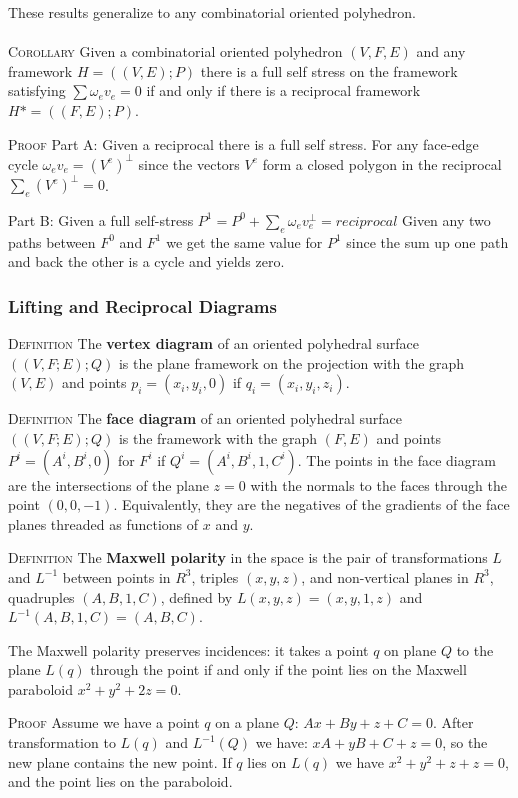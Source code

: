 \documentclass[english]{article}
\begin{document}
These results generalize to any combinatorial oriented polyhedron. \\
\\
\textsc{Corollary} Given a combinatorial oriented polyhedron $(V,F,E)$ and any framework $H = ((V,E);P)$ there is a full self stress on the framework satisfying $\sum \omega_ev_e = 0$ if and only if there is a reciprocal framework $H* = ((F,E);P)$. 

\textsc{Proof} Part A: Given a reciprocal there is a full self stress.
For any face-edge cycle $\omega_e v_e = (V^e)^{\bot}$ since the vectors $V^e$ form a closed polygon in the reciprocal $\sum_e(V^e)^\bot = 0$.

Part B: Given a full self-stress $P^1 = P^0 + \sum_e \omega_ev_e^\bot = reciprocal$
Given any two paths between $F^0$ and $F^1$ we get the same value for $P^1$ since the sum up one path and back the other is a cycle and yields zero.


\subsubsection{Lifting and Reciprocal Diagrams}
\textsc{Definition} The \textbf{vertex diagram} of an oriented polyhedral surface $((V,F;E);Q)$ is the plane framework on the projection with the graph $(V,E)$ and points $p_i = (x_i,y_i,0)$ if $q_i = (x_i,y_i,z_i)$.


\textsc{Definition} The \textbf{face diagram} of an oriented polyhedral surface $((V,F;E);Q)$ is the framework with the graph $(F,E)$ and points $P^i = (A^i,B^i,0)$ for $F^i$ if $Q^i = (A^i,B^i,1,C^i)$. The points in the face diagram are the intersections of the plane $z=0$ with the normals to the faces through the point $(0,0,-1)$. Equivalently, they are the negatives of the gradients of the face planes threaded as functions of $x$ and $y$.
 
 \textsc{Definition} The \textbf{Maxwell polarity} in the space is the pair of transformations $L$ and $L^{-1}$ between points in $R^3$, triples $(x,y,z)$, and non-vertical planes in $R^3$, quadruples $(A,B,1,C)$, defined by $L(x,y,z)=(x,y,1,z)$ and $L^{-1}(A,B,1,C) = (A,B,C)$.
 
 The Maxwell polarity preserves incidences: it takes a point $q$ on plane $Q$ to the plane $L(q)$ through the point if and only if the point lies on the Maxwell paraboloid $x^2 + y^2 + 2z = 0$.
 
 \textsc{Proof} Assume we have a point $q$ on a plane $Q$: $Ax + By + z + C = 0$. After transformation to $L(q)$ and $L^{-1}(Q)$ we have: $xA + yB + C + z = 0$, so the new plane contains the new point. If $q$ lies on $L(q)$ we have $x^2 + y^2 + z + z = 0$, and the point lies on the paraboloid. 
 
\end{document}
